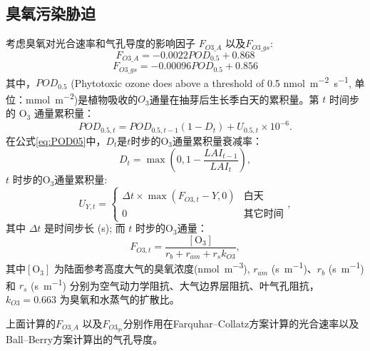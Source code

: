 \subsection{臭氧污染胁迫}
考虑臭氧对光合速率和气孔导度的影响因子 $F_{O3\_A}$ 以及$F_{O3\_{gs}}$:
\begin{equation}
F_{O3\_{A}}=-0.0022 POD_{0.5}+0.868
\end{equation}
\begin{equation}
F_{O3\_{gs}}=-0.00096 POD_{0.5}+0.856
\end{equation}
其中，$POD_{0.5}$ (Phytotoxic ozone does above a threshold of 0.5 \unit{nmol.m^{-2}.s^{-1}}, 单位：\unit{mmol.m^{-2}})是植物吸收的$O_3$通量在抽芽后生长季白天的累积量。第 $t$ 时间步的 $\mathrm{O_3}$ 通量累积量：
\begin{equation}\label{eq:POD05}
POD_{0.5,t}=POD_{0.5,t-1}\left(1-D_t\right)+U_{0.5,t} \times 10^{-6}.
\end{equation}
在公式\eqref{eq:POD05}中，$D_t$是$t$时步的$\mathrm{O_3}$通量累积量衰减率：
\begin{equation}
D_t = \max\left(0, 1-\frac{LAI_{t-1}}{LAI_t} \right),
\end{equation}
$t$ 时步的$\mathrm{O_3}$通量累积量:
\begin{equation}
U_{Y,t}=\begin{cases}
    \Delta t\times\max(F_{O3,t}-Y, 0) & \text{白天} \\
    0 & \text{其它时间}
\end{cases},
\end{equation}
其中 $\Delta t$ 是时间步长 (s); 而 $t$ 时步的$\mathrm{O_3}$通量：
\begin{equation}
    F_{O3,t}=\frac{\mathrm{[O_3]}}{r_b + r_{am} + r_sk_{O3}},
\end{equation}
其中$\mathrm{[O_3]}$ 为陆面参考高度大气的臭氧浓度(\unit{nmol.m^{-3}}), $r_{am}$ (\unit{s.m^{-1}})、$r_b$ (\unit{s.m^{-1}}) 和 $r_s$ (\unit{s.m^{-1}}) 分别为空气动力学阻抗、大气边界层阻抗、叶气孔阻抗，$k_{O3}=0.663$ 为臭氧和水蒸气的扩散比。

上面计算的$F_{{O3}\_A}$ 以及$F_{O3_{gs}}$分别作用在Farquhar--Collatz方案计算的光合速率以及Ball--Berry方案计算出的气孔导度。

